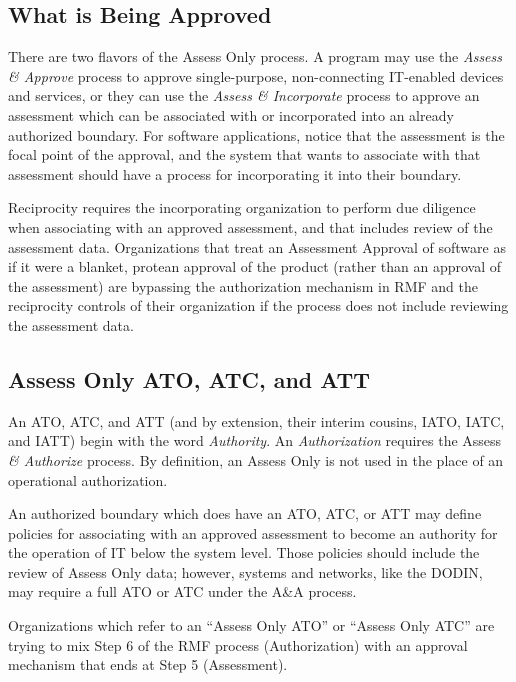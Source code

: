 \subsection{What is Being Approved}
There are two flavors of the Assess Only process. A program may use the \textit{Assess \& Approve} process to approve single-purpose, non-connecting IT-enabled devices and services, or they can use the \textit{Assess \& Incorporate} process to approve an assessment which can be associated with or incorporated into an already authorized boundary.\autocite[\pno~11]{20240212:vaglia2017} For software applications, notice that the assessment is the focal point of the approval, and the system that wants to associate with that assessment should have a process for incorporating it into their boundary.

Reciprocity requires the incorporating organization to perform due diligence when associating with an approved assessment, and that includes review of the assessment data. Organizations that treat an Assessment Approval of software as if it were a blanket, protean approval of the product (rather than an approval of the assessment) are bypassing the authorization mechanism in RMF and the reciprocity controls of their organization if the process does not include reviewing the assessment data.

\subsection{Assess Only ATO, ATC, and ATT}
An ATO, ATC, and ATT (and by extension, their interim cousins, IATO, IATC, and IATT) begin with the word \textit{Authority}. An \textit{Authorization} requires the Assess \textit{\& Authorize} process. By definition, an Assess Only is not used in the place of an operational authorization.

An authorized boundary which does have an ATO, ATC, or ATT may define policies for associating with an approved assessment to become an authority for the operation of IT below the system level. Those policies should include the review of Assess Only data; however, systems and networks, like the DODIN, may require a full ATO or ATC under the A\&A process.\autocite{20240212:disncpg}

Organizations which refer to an ``Assess Only ATO'' or ``Assess Only ATC'' are trying to mix Step 6 of the RMF process (Authorization) with an approval mechanism that ends at Step 5 (Assessment).

